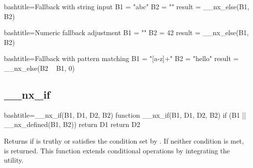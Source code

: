 \begin{NexCodeBox}{bash}{title={Fallback with string input}}
	B1 = "abc"
	B2 = ""
	result = __nx_else(B1, B2)
\end{NexCodeBox}

\begin{NexCodeBox}{bash}{title={Numeric fallback adjustment}}
	B1 = ""
	B2 = 42
	result = __nx_else(B1, B2)
\end{NexCodeBox}

\begin{NexCodeBox}{bash}{title={Fallback with pattern matching}}
	B1 = "[a-z]+"
	B2 = "hello"
	result = __nx_else(B2 ~ B1, 0)
\end{NexCodeBox}

\newpage
\subsection{__nx_if}
\label{__nx_if}
\begin{NexCodeBox}{bash}{title={__nx_if(B1, D1, D2, B2)}}
function __nx_if(B1, D1, D2, B2) {
	if (B1 || __nx_defined(B1, B2))
		return D1
	return D2
}
\end{NexCodeBox}

\begin{NexMainBox}
	\begin{NexMainBox}
		Returns  if  is truthy or satisfies the condition set by . If neither condition is met,  is returned. This function extends conditional operations by integrating the  utility.
	\end{NexMainBox}
	\begin{NexMainBox}
		\begin{NexListDark}
		\end{NexListDark}
	\end{NexMainBox}
\end{NexMainBox}

